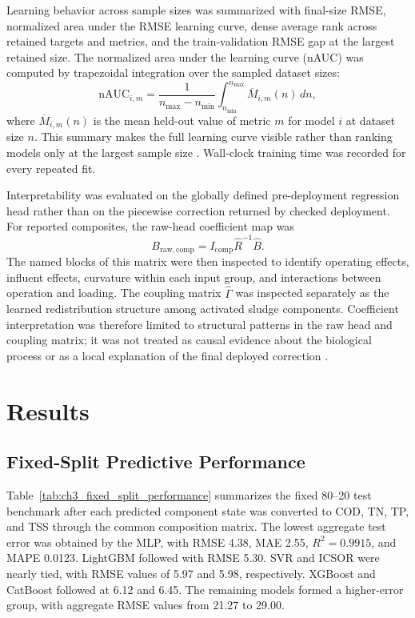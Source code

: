 \documentclass[12pt, twoside]{book}
\begin{document}
Learning behavior across sample sizes was summarized with final-size RMSE, normalized area under the RMSE
learning curve, dense average rank across retained targets and metrics, and the train-validation RMSE gap at
the largest retained size. The normalized area under the learning curve (nAUC) was computed by trapezoidal
integration over the sampled dataset sizes:
\begin{equation}
\label{eq:ch3_nauc}
\mathrm{nAUC}_{i,m}
=\frac{1}{n_{\max}-n_{\min}}
\int_{n_{\min}}^{n_{\max}}\overline{M}_{i,m}(n)\,dn,
\end{equation}
where \(\overline{M}_{i,m}(n)\) is the mean held-out value of metric \(m\) for model \(i\) at dataset size
\(n\). This summary makes the full learning curve visible rather than ranking models only at the largest
sample size \citep{VieringLoog2023}. Wall-clock training time was recorded for every repeated fit.

Interpretability was evaluated on the globally defined pre-deployment regression head rather than on the
piecewise correction returned by checked deployment. For reported composites, the raw-head coefficient map was
\begin{equation}
\label{eq:ch3_raw_head_coefficients}
B_{\mathrm{raw,comp}}=I_{\mathrm{comp}}\widehat{R}^{-1}\widehat{B}.
\end{equation}
The named blocks of this matrix were then inspected to identify operating effects, influent effects, curvature
within each input group, and interactions between operation and loading. The coupling matrix
\(\widehat{\Gamma}\) was inspected separately as the learned redistribution structure among activated sludge
components. Coefficient interpretation was therefore limited to structural patterns in the raw head and
coupling matrix; it was not treated as causal evidence about the biological process or as a local explanation
of the final deployed correction \citep{Rudin2019,Shen2023}.

\section{Results}

\subsection{Fixed-Split Predictive Performance}

Table~\ref{tab:ch3_fixed_split_performance} summarizes the fixed 80--20 test benchmark after each predicted
component state was converted to COD, TN, TP, and TSS through the common composition matrix. The lowest
aggregate test error was obtained by the MLP, with RMSE 4.38, MAE 2.55, \(R^2=0.9915\), and MAPE 0.0123.
LightGBM followed with RMSE 5.30. SVR and ICSOR were nearly tied, with RMSE values of 5.97 and 5.98,
respectively. XGBoost and CatBoost followed at 6.12 and 6.45. The remaining models formed a higher-error
group, with aggregate RMSE values from 21.27 to 29.00.
\end{document}
